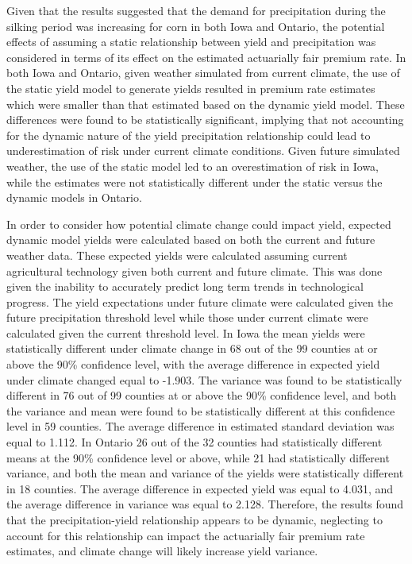Given that the results suggested that the demand for precipitation during the silking period was increasing for corn in both Iowa and Ontario, the potential effects of assuming a static relationship between yield and precipitation was considered in terms of its effect on the estimated actuarially fair premium rate. In both Iowa and Ontario, given weather simulated from current climate, the use of the static yield model to generate yields resulted in premium rate estimates which were smaller than that estimated based on the dynamic yield model. These differences were found to be statistically significant, implying that not accounting for the dynamic nature of the yield precipitation relationship could lead to underestimation of risk under current climate conditions. Given future simulated weather, the use of the static model led to an overestimation of risk in Iowa, while the estimates were not statistically different under the static versus the dynamic models in Ontario.

In order to consider how potential climate change could impact yield, expected dynamic model yields were calculated based on both the current and future weather data. These expected yields were calculated assuming current agricultural technology given both current and future climate. This was done given the inability to accurately predict long term trends in technological progress. The yield expectations under future climate were calculated given the future precipitation threshold level while those under current climate were calculated given the current threshold level. In Iowa the mean yields were statistically different under climate change in 68 out of the 99 counties at or above the 90\% confidence level, with the average difference in expected yield under climate changed equal to -1.903. The variance was found to be statistically different in 76 out  of 99 counties at or above the 90\% confidence level, and both the variance and mean were found to be statistically different at this confidence level in 59 counties. The average difference in estimated standard deviation was equal to 1.112.  In Ontario 26 out of the 32 counties had statistically different means at the 90\% confidence level or above, while 21 had statistically different variance, and both the mean and variance of the yields were statistically different in 18 counties. The average difference in expected yield was equal to 4.031, and the average difference in variance was equal to 2.128. Therefore, the results found that the precipitation-yield relationship appears to be dynamic, neglecting to account for this relationship can impact the actuarially fair premium rate estimates, and climate change will likely increase yield variance.

